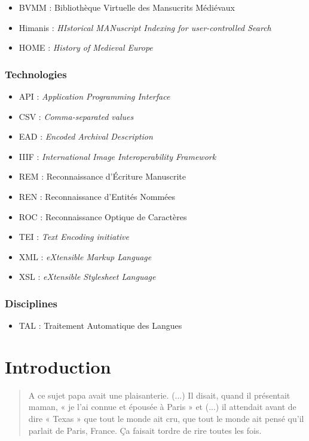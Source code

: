 \documentclass[a4paper,12pt,twoside]{book}
\begin{document}
	\begin{itemize}
		\item BVMM : Bibliothèque Virtuelle des Mansucrits Médiévaux
		\item Himanis : \textit{HIstorical MANuscript Indexing for user-controlled Search}
		\item HOME : \textit{History of Medieval Europe}
	\end{itemize}
	
	\subsection*{Technologies}
	
	\begin{itemize}
		\item API : \textit{Application Programming Interface}
		\item CSV : \textit{Comma-separated values}
		\item EAD : \textit{Encoded Archival Description}
		\item IIIF : \textit{International Image Interoperability Framework}
		\item REM : Reconnaissance d'Écriture Manuscrite
		\item REN : Reconnaissance d'Entités Nommées
		\item ROC : Reconnaissance Optique de Caractères
		\item TEI : \textit{Text Encoding initiative}
		\item XML : \textit{eXtensible Markup Language}
		\item XSL : \textit{eXtensible Stylesheet Language}
	\end{itemize}

	\subsection*{Disciplines}
	
	\begin{itemize}
		\item TAL : Traitement Automatique des Langues
	\end{itemize}

	
	\printbibliography
	
	\chapter{Introduction}
	
	\begin{quotation}
		
	A ce sujet papa avait une plaisanterie. (...) Il disait, quand il présentait maman, « je l’ai connue et épousée à Paris » et (...) il attendait avant de dire « Texas » que tout le monde ait cru, que tout le monde ait pensé qu’il parlait de Paris, France. Ça faisait tordre de rire toutes les fois.
	
	\end{quotation}
	\bigbreak
	
\end{document}
